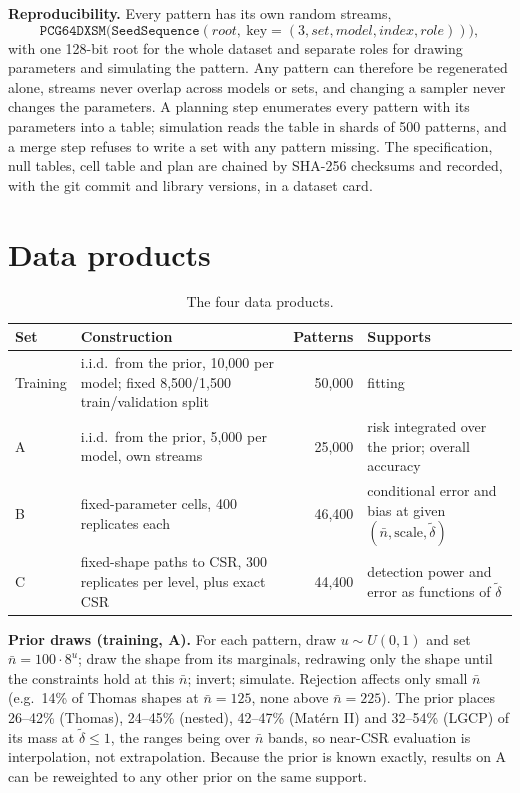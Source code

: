 \documentclass[10pt,a4paper]{article}
\newcommand{\nbar}{\bar n}
\newcommand{\dtil}{\tilde\delta}
\begin{document}
\textbf{Reproducibility.} Every pattern has its own random streams,
\[
\texttt{PCG64DXSM}\big(\texttt{SeedSequence}(\textit{root},\ \text{key}=(3,\textit{set},\textit{model},\textit{index},\textit{role}))\big),
\]
with one 128-bit root for the whole dataset and separate roles for drawing parameters and simulating the pattern. Any pattern can therefore be regenerated alone, streams never overlap across models or sets, and changing a sampler never changes the parameters. A planning step enumerates every pattern with its parameters into a table; simulation reads the table in shards of 500 patterns, and a merge step refuses to write a set with any pattern missing. The specification, null tables, cell table and plan are chained by SHA-256 checksums and recorded, with the git commit and library versions, in a dataset card.

\section{Data products}\label{sec:sets}

\begin{table}[ht]
\centering\small
\begin{tabularx}{\linewidth}{@{}l L r L@{}}
\toprule
Set & Construction & Patterns & Supports\\
\midrule
Training & i.i.d.\ from the prior, 10{,}000 per model; fixed 8{,}500/1{,}500 train/validation split & 50{,}000 & fitting\\
A & i.i.d.\ from the prior, 5{,}000 per model, own streams & 25{,}000 & risk integrated over the prior; overall accuracy\\
B & fixed-parameter cells, 400 replicates each & 46{,}400 & conditional error and bias at given $(\nbar,\text{scale},\dtil)$\\
C & fixed-shape paths to CSR, 300 replicates per level, plus exact CSR & 44{,}400 & detection power and error as functions of $\dtil$\\
\bottomrule
\end{tabularx}
\caption{The four data products.}
\label{tab:sets}
\end{table}

\textbf{Prior draws (training, A).} For each pattern, draw $u\sim U(0,1)$ and set $\nbar=100\cdot8^u$; draw the shape from its marginals, redrawing only the shape until the constraints hold at this $\nbar$; invert; simulate. Rejection affects only small $\nbar$ (e.g.\ 14\% of Thomas shapes at $\nbar=125$, none above $\nbar=225$). The prior places 26--42\% (Thomas), 24--45\% (nested), 42--47\% (Mat\'ern II) and 32--54\% (LGCP) of its mass at $\dtil\le1$, the ranges being over $\nbar$ bands, so near-CSR evaluation is interpolation, not extrapolation. Because the prior is known exactly, results on A can be reweighted to any other prior on the same support.
\end{document}

